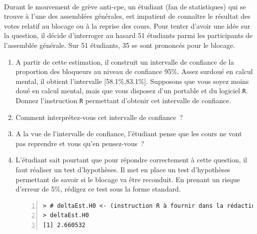\documentclass[10pt]{report}
\begin{document}
\begin{exercice}~ 

Durant le mouvement de grève anti-cpe, un étudiant (fan de statistiques) qui se trouve à l'une des assemblées générales, est impatient de connaître le résultat des votes relatif au blocage ou à la reprise des cours. Pour tenter d'avoir une idée sur la question, il décide d'interroger au hasard 51 étudiants parmi les participants de l'assemblée générale. Sur 51 étudiants, 35 se sont prononcés pour le blocage. 

\begin{enumerate}
\item 
A partir de cette estimation, il construit un intervalle de confiance de la proportion des bloqueurs au niveau de confiance 95\%. Assez surdoué en calcul mental, il obtient l'intervalle [58.1\%,83.1\%]. Supposons que vous soyez moins doué en calcul mental, mais que vous disposez d'un portable et du logiciel \texttt{R}. Donnez l'instruction \texttt{R} permettant d'obtenir cet intervalle de confiance.


 


\item 
Comment interprétez-vous cet intervalle de confiance~?





\item  
A la vue de l'intervalle de confiance, l'étudiant pense que les cours ne vont pas reprendre et vous qu'en pensez-vous~?





\item  
L'étudiant sait pourtant que pour répondre correctement à cette question, il faut réaliser un test d'hypothèses. Il met en place un test d'hypothèses permettant de savoir si le blocage va être reconduit. En prenant un risque d'erreur de 5\%, rédigez ce test sous la forme standard.

\IndicR
\begin{Verbatim}[frame=leftline,fontfamily=tt,fontshape=n,numbers=left]
> # deltaEst.H0 <- (instruction R à fournir dans la rédaction)
> deltaEst.H0
[1] 2.660532
\end{Verbatim}





\end{enumerate}


\end{exercice}
\end{document}
